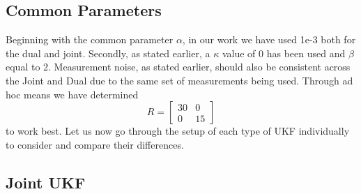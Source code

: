 \documentclass{article}
\begin{document}
\subsection{Common Parameters}
Beginning with the common parameter $\alpha$, in our work we have used 1e-3 both for the dual and joint. Secondly, as stated earlier, a $\kappa$ value of 0 has been used and $\beta$ equal to 2. Measurement noise, as stated earlier, should also be consistent across the Joint and Dual due to the same set of measurements being used. Through ad hoc means we have determined
\begin{equation}
R = \begin{bmatrix}
30 & 0\\0 & 15\end{bmatrix}
\end{equation}
to work best.
Let us now go through the setup of each type of UKF individually to consider and compare their differences.

\subsection{Joint UKF}
\end{document}
